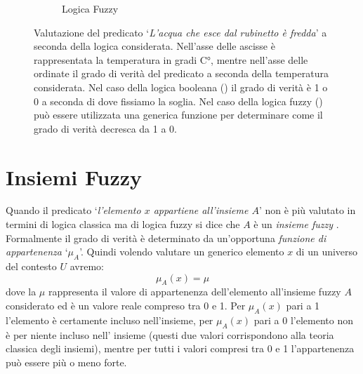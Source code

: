 \documentclass[a4paper,12pt]{report}
\begin{document}
\begin{figure}
\begin{subfigure}[t]{.5\textwidth}
{\begin{tikzpicture}
        \end{tikzpicture}
        }
        \caption{Logica Fuzzy}
        \label{subfig:Logica_fuzzy_grafico}
    \end{subfigure}
    \caption{Valutazione del predicato `\textit{L'acqua che esce dal rubinetto è fredda}' a seconda della logica considerata. Nell'asse delle ascisse è rappresentata la temperatura in gradi C°, mentre nell'asse delle ordinate il grado di verità del predicato a seconda della temperatura considerata. Nel caso della logica booleana () il grado di verità è 1 o 0 a seconda di dove fissiamo la soglia. Nel caso della logica fuzzy () può essere utilizzata una generica funzione per determinare come il grado di verità decresca da 1 a 0.}
    \label{fig:Differenze_Logiche}
\end{figure}

\newpage

\section{Insiemi Fuzzy}
Quando il predicato `\textit{l'elemento $x$ appartiene all'insieme $A$}' non è  più valutato in termini di logica classica ma di logica fuzzy si dice che $A$ è un \textit{insieme fuzzy} \cite{logica_fuzzy}. 
Formalmente il grado di verità è determinato da un'opportuna \textit{funzione di appartenenza} `$\mu_A$'. Quindi volendo valutare un generico elemento $x$ di un universo del contesto $U$ avremo:
\begin{equation*}
    \mu_A(x) = \mu
\end{equation*}
\noindent 
dove la $\mu$ rappresenta il valore di appartenenza dell'elemento all'insieme fuzzy $A$ considerato ed è un valore reale compreso tra 0 e 1. 
Per $\mu_A(x)$ pari a 1 l’elemento è certamente incluso nell’insieme, per $\mu_A(x)$ pari a 0
l’elemento non è per niente incluso nell’ insieme (questi due valori corrispondono alla teoria classica degli insiemi), mentre per tutti i valori compresi tra 0 e 1 l’appartenenza può essere più o meno forte.

\bigskip
\end{document}
